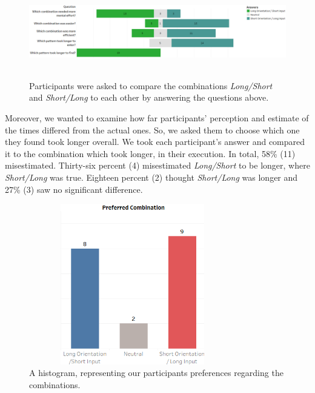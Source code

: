 \begin{figure}[t!]
\centering
\includegraphics[width=15cm, height=4cm]{Chapters/graphics/Likert2.png}
\caption{Participants were asked to compare the combinations \textit{Long/Short} and \textit{Short/Long} to each other by answering the questions above.  }
\label{fig:likert2}
\end{figure}

Moreover, we wanted to examine how far participants' perception and estimate of the times differed from the actual ones. So, we asked them to choose which one they found took longer overall. We took each participant's answer and compared it to the combination which took longer, in their execution. In total, 58\% (11) misestimated. Thirty-six percent (4) misestimated \textit{Long/Short} to be longer, where \textit{Short/Long} was true. Eighteen percent (2) thought \textit{Short/Long} was longer and 27\% (3) saw no significant difference. \\


\begin{figure}[t!]
\centering
\includegraphics[width=9cm, height=7cm]{Chapters/graphics/preference.png}
\caption{A histogram, representing our participants preferences regarding the combinations.}
\label{fig:preference}
\end{figure}

